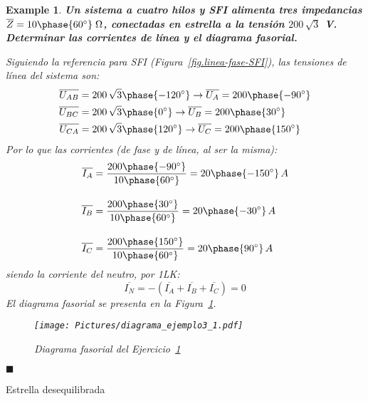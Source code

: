 \documentclass[11pt]{book} %
\makeatletter
\numberwithin{dummy}{section}
\theoremstyle{ocrenumbox}
\theoremstyle{blacknumex}
\newtheorem{exampleT}{Example}[chapter]
\theoremstyle{blacknumbox}
\theoremstyle{ocrenum}
\newenvironment{example}{\begin{exampleT}}{\hfill{\tiny\ensuremath{\blacksquare}}\end{exampleT}}
\renewcommand{\subsubsection}{\@startsection {subsubsection}{3}{\z@}
{-2ex \@plus -0.1ex \@minus -.2ex}
{.2ex \@plus.2ex }
{\normalfont\small\sffamily\bfseries}}
\makeatother
\begin{document}
	
	
    \vspace{4mm}
    \begin{example}\label{ej.3-1}
	    \textbf{Un sistema a cuatro hilos y SFI alimenta tres impedancias $\overline{Z}=10\phase{60^\circ}\;\Omega$, conectadas en estrella a la tensión $200\,\sqrt{3}$ V. Determinar las corrientes de línea y el diagrama fasorial.}
	    
	    Siguiendo la referencia para SFI (Figura~\ref{fig.linea-fase-SFI}), las tensiones de línea del sistema son:
	    \begin{align*}
	        \overline{U_{AB}}&=200\,\sqrt{3}\phase{-120^\circ}\rightarrow \overline{U_A}=200\phase{-90^\circ}\\
	        \overline{U_{BC}}&=200\,\sqrt{3}\phase{0^\circ}\rightarrow \overline{U_B}=200\phase{30^\circ}\\
	        \overline{U_{CA}}&=200\,\sqrt{3}\phase{120^\circ}\rightarrow \overline{U_C}=200\phase{150^\circ}
	    \end{align*}
	    Por lo que las corrientes (de fase y de línea, al ser la misma):
	    \begin{align*}
	        \overline{I_A} &= \frac{200\phase{-90^\circ}}{10\phase{60^\circ}} =20\phase{-150^\circ} \,A \\[10pt]
          \overline{I_B} &= \frac{200\phase{30^\circ}}{10\phase{60^\circ}} = 20\phase{-30^\circ} \,A\\[10pt]
          \overline{I_C} &=\frac{200\phase{150^\circ}}{10\phase{60^\circ}} = 20\phase{90^\circ} \,A
	    \end{align*}
	    siendo la corriente del neutro, por 1LK:
	    \begin{equation*}
	        \overline{I_N}=-(\overline{I_A}+\overline{I_B}+\overline{I_C})=0
	    \end{equation*}
	    El diagrama fasorial se presenta en la Figura~\ref{fig.diagrama_ejemplo_3-1}. 
	    \begin{figure}[htbp]
	        \centering
	        \texttt{[image: Pictures/diagrama\_ejemplo3\_1.pdf]}
	        \caption{Diagrama fasorial del Ejercicio~\ref{ej.3-1}}
	        \label{fig.diagrama_ejemplo_3-1}
	    \end{figure}
	\end{example}
	
	\subsubsection{Estrella desequilibrada}
	
\end{document}
